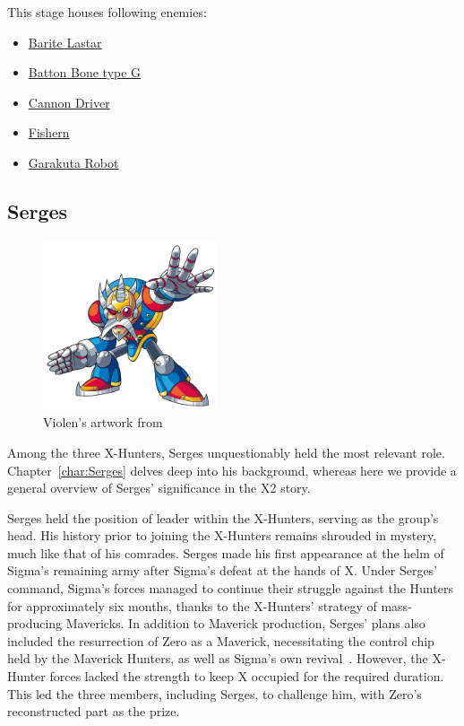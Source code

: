 This stage houses following enemies:
\begin{itemize}
	\item \hyperlink{enem:Barite_Lastar}{Barite Lastar}
	\item \hyperlink{enem:Batton_Bone_type_G}{Batton Bone type G}
	\item \hyperlink{enem:Cannon_Driver}{Cannon Driver}
	\item \hyperlink{enem:Fishern}{Fishern}
	\item \hyperlink{enem:Garakuta_Robot}{Garakuta Robot}
\end{itemize}

\subsection{Serges}\label{boss:Serges}
\begin{figure}[htp]
	\centering
	\includegraphics[height=5cm]{figures/Characters/Char_Serges.png}
	\caption{Violen's artwork from \cite{book:MMX_Complete_art}}
\end{figure}
Among the three X-Hunters, Serges unquestionably held the most relevant role. Chapter~\ref{char:Serges} delves deep into his background, whereas here we provide a general overview of Serges' significance in the X2 story.

Serges held the position of leader within the X-Hunters, serving as the group's head. His history prior to joining the X-Hunters remains shrouded in mystery, much like that of his comrades. Serges made his first appearance at the helm of Sigma's remaining army after Sigma's defeat at the hands of X. Under Serges' command, Sigma's forces managed to continue their struggle against the Hunters for approximately six months, thanks to the X-Hunters' strategy of mass-producing Mavericks. In addition to Maverick production, Serges' plans also included the resurrection of Zero as a Maverick, necessitating the control chip held by the Maverick Hunters, as well as Sigma's own revival~\cite{wayback:X2_resources}. However, the X-Hunter forces lacked the strength to keep X occupied for the required duration. This led the three members, including Serges, to challenge him, with Zero's reconstructed part as the prize.

